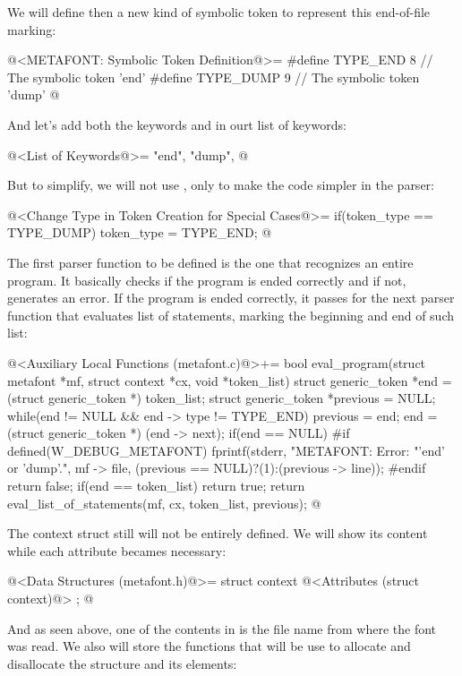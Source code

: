 We will define then a new kind of symbolic token to represent this
end-of-file marking:

\iniciocodigo
@<METAFONT: Symbolic Token Definition@>=
#define TYPE_END             8 // The symbolic token 'end'
#define TYPE_DUMP            9 // The symbolic token 'dump'
@
\fimcodigo

And let's add both the keywords  and 
in ourt list of keywords:

\iniciocodigo
@<List of Keywords@>=
"end", "dump",
@
\fimcodigo

But to simplify, we will not use ,
only  to make the code simpler in the parser:

\iniciocodigo
@<Change Type in Token Creation for Special Cases@>=
if(token_type == TYPE_DUMP)
  token_type = TYPE_END;
@
\fimcodigo


The first parser function to be defined is the one that recognizes an
entire program. It basically checks if the program is ended correctly
and if not, generates an error. If the program is ended correctly, it
passes for the next parser function that evaluates list of statements,
marking the beginning and end of such list:

\iniciocodigo
@<Auxiliary Local Functions (metafont.c)@>+=
bool eval_program(struct metafont *mf, struct context *cx,
                  void *token_list){
  struct generic_token *end = (struct generic_token *) token_list;
  struct generic_token *previous = NULL;
  while(end != NULL && end -> type != TYPE_END){
    previous = end;
    end = (struct generic_token *) (end -> next);
  }
  if(end == NULL){
#if defined(W_DEBUG_METAFONT)
    fprintf(stderr, "METAFONT: Error: %
                    "'end' or 'dump'.\n", mf -> file,
                    (previous == NULL)?(1):(previous -> line));
#endif
    return false;
  }
  if(end == token_list)
    return true;
  return eval_list_of_statements(mf, cx, token_list, previous);
}
@
\fimcodigo

The context struct still will not be entirely defined. We will show
its content while each attribute becames necessary:

\iniciocodigo
@<Data Structures (metafont.h)@>=
struct context{
  @<Attributes (struct context)@>
};
@
\fimcodigo


And as seen above, one of the contents in 
is the file name from where the font was read. We also will store the
functions that will be use to allocate and disallocate the structure
and its elements:

